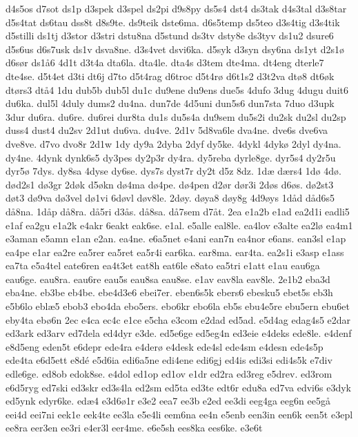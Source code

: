 d4s5os
d7sot
ds1p
d3spek
d3spel
ds2pi
d9s8py
ds5s4
dst4
ds3tak
d4s3tal
d3s8tar
d5s4tat
ds6tau
dss8t
d8s9te.
ds9teik
dste6ma.
d6s5temp
ds5teo
d3s4tig
d3s4tik
d5stilli
ds1tj
d3stor
d3stri
dstu8na
d5stund
ds3tv
dsty8e
ds3tyv
ds1u2
dsure6
d5s6us
d6s7usk
ds1v
dsva8ne.
d3s4vet
dsvi6ka.
d5syk
d3syn
dsy6na
ds1yt
d2s1^^f8
d6s^^f8r
ds1^^e56
4d1t
d3t4a
dta6la.
dta4le.
dta4s
d3tem
dte4ma.
dt4eng
dterle7
dte4se.
d5t4et
d3ti
dt6j
d7to
d5t4rag
d6troc
d5t4r^^f8
d6t1s2
d3t2va
dt^^f88
dt6^^f8k
dt^^f8rs3
dt^^e54
1du
dub5b
dub5l
du1c
du9ene
du9ens
due5s
4dufo
3dug
4dugu
duit6
du6ka.
dul5l
4duly
dums2
du4na.
dun7de
4d5uni
dun5s6
dun7sta
7duo
d3upk
3dur
du6ra.
du6re.
du6rei
dur8ta
du1s
du5s4a
du9sem
du5s2i
du2sk
du2sl
du2sp
duss4
dust4
du2sv
2d1ut
du6va.
du4ve.
2d1v
5d8va6le
dva4ne.
dve6s
dve6va
dve8ve.
d7vo
dvo8r
2d1w
1dy
dy9a
2dyba
2dyf
dy5ke.
4dykl
4dyk^^f8
2dyl
dy4na.
dy4ne.
4dynk
dynk6s5
dy3pes
dy2p3r
dy4ra.
dy5reba
dyrle8ge.
dyr5s4
dy2r5u
dyr5^^f8
7dys.
dy8sa
4dyse
dy6se.
dys7s
dyst7r
dy2t
d5z
8dz.
1d^^e6
d^^e6rs4
1d^^f8
4d^^f8.
d^^f8d2s1
d^^f83gr
2d^^f8k
d5^^f8kn
d^^f84ma
d^^f84pe.
d^^f84pen
d2^^f8r
d^^f8r3i
2d^^f8s
d6^^f8s.
d^^f82st3
d^^f8t3
d^^f89va
d^^f83vel
d^^f81vi
6d^^f8vl
d^^f8v8le.
2d^^f8y.
d^^f8ya8
d^^f8y8g
4d9^^f8ys
1d^^e5d
d^^e5d6s5
d^^e58na.
1d^^e5p
d^^e58ra.
d^^e55ri
d3^^e5s.
d^^e58sa.
d^^e57sem
d7^^e5t.
2ea
e1a2b
e1ad
ea2d1i
eadli5
e1af
ea2gu
e1a2k
e4akr
6eakt
eak6se.
e1al.
e5alle
eal8le.
ea4lov
e3alte
ea2l^^f8
ea4m1
e3aman
e5amn
e1an
e2an.
ea4ne.
e6a5net
e4ani
ean7n
ea4nor
e6ans.
ean3sl
e1ap
ea4pe
e1ar
ea2re
ea5rer
ea5ret
ea5r4i
ear6ka.
ear8ma.
ear4ta.
ea2s1i
e3asp
e1ass
ea7ta
e5a4tel
eate6ren
ea4t3et
eat8h
eat6le
e8ato
ea5tri
e1att
e1au
eau6ga
eau6ge.
eau8ra.
eau6re
eau5s
eau8sa
eau8se.
e1av
eav8la
eav8le.
2e1b2
eba3d
eba4ne.
eb3be
eb4be.
ebe4d3e6
ebei7er.
eben6s5k
ebers6
ebesku5
ebet5s
eb3h
e5b6lo
ebl^^e65
ebob3
ebo4da
ebo5ers.
ebo6kr
ebo6la
eb5s
ebu4e5re
ebu5ern
ebu6et
eby4ta
eb^^f86n
2ec
e4ca
ec4c
e1ce
e5cha
e3com
e2dad
ed5ad.
e5d4ag
edag4s5
e2dar
ed3ark
ed3arv
ed7dela
ed4dyr
e3de.
ed5e6ge
ed5eg4n
ed3eie
e4deks
ede8le.
e4denf
e8d5eng
eden5t
e6depr
ede4ra
e4der^^f8
e4desk
ede4sl
ede4sm
e4desn
ede4s5p
ede4ta
e6d5ett
e8d^^e9
e5d6ia
edi6a5ne
edi4ene
edi6gj
ed4is
edi3si
edi4s5k
e7div
edle6ge.
ed8ob
edok8se.
e4dol
ed1op
ed1ov
e1dr
ed2ra
ed3reg
e5drev.
ed3rom
e6d5ryg
ed7ski
ed3skr
ed3s4la
ed2sm
ed5ta
ed3te
edt6r
edu8a
ed7va
edvi6s
e3dyk
ed5ynk
edyr6ke.
ed^^e64
e3d6^^f81r
e3e2
eea7
ee3b
e2ed
ee3di
eeg4ga
eeg6n
ee5g^^e5
eei4d
eei7ni
eek1e
eek4te
ee3la
e5e4li
eem6na
ee4n
e5enb
een3in
een6k
een5t
e3epl
ee8ra
eer3en
ee3ri
e4er3l
eer4me.
e6e5sh
ees8ka
ees6ke.
e3e6t

